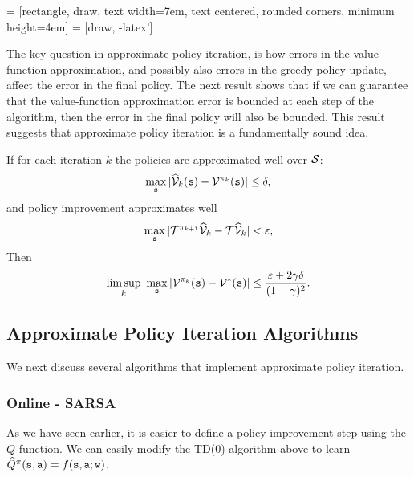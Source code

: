 \vspace{20pt}
 = [rectangle, draw,
    text width=7em, text centered, rounded corners, minimum height=4em]
 = [draw, -latex']
\vspace{20pt}

The key question in approximate policy iteration, is how errors in the value-function approximation, and possibly also errors in the greedy policy update, affect the error in the final policy. The next result shows that if we can guarantee that the value-function approximation error is bounded at each step of the algorithm, then the error in the final policy will also be bounded. This result suggests that approximate policy iteration is a fundamentally sound idea.

\begin{theorem}\label{thm:API}
If for each iteration $k$ the policies are approximated well over $\mathcal{S}$:
$$\max_{\tt s} |\widehat{\mathcal{V}}_k({\tt s})-\mathcal{V}^{\pi_k}({\tt s})| \le \delta,$$
and policy improvement approximates well
$$ \max_{\tt s} |\mathcal{T}^{\pi_{k+1}}\widehat{\mathcal{V}}_k - \mathcal{T}\widehat{\mathcal{V}}_k| < \varepsilon,$$
Then
$$ \limsup_k \ \max_{\tt s} | \mathcal{V}^{\pi_k}({\tt s})-\mathcal{V}^*({\tt s})| \le \frac{\varepsilon+2\gamma\delta}{(1-\gamma)^2}.$$
\end{theorem}

\subsection{Approximate Policy Iteration Algorithms}

We next discuss several algorithms that implement approximate policy iteration.

\subsubsection{Online - SARSA}
As we have seen earlier, it is easier to define a policy improvement step using the $Q$ function. We can easily modify the TD(0) algorithm above to learn $\widehat{Q}^\pi({\tt s},{\tt a}) = f({\tt s},{\tt a};{\tt w})$.

